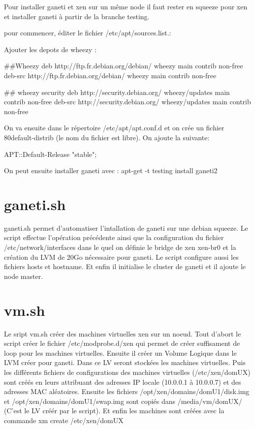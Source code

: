 
Pour installer ganeti et xen sur un même node il faut rester en squeeze pour xen et installer ganeti à partir  de la branche testing.

pour commencer, éditer le fichier /etc/apt/sources.list.:

Ajouter les depots de wheezy :

##Wheezy
deb http://ftp.fr.debian.org/debian/ wheezy main contrib non-free
deb-src http://ftp.fr.debian.org/debian/ wheezy main contrib non-free

## wheezy security
deb http://security.debian.org/ wheezy/updates main contrib non-free
deb-src http://security.debian.org/ wheezy/updates main contrib non-free


On va ensuite dans le répertoire /etc/apt/apt.conf.d et on crée un fichier 80default-distrib (le nom du fichier est libre). On ajoute la  suivante:

APT::Default-Release "stable";

On peut ensuite installer ganeti avec :
apt-get -t testing install ganeti2

\section {ganeti.sh}

ganeti.sh permet d'automatiser l'intallation de ganeti sur une debian squeeze.
Le script effectue l'opération précédente ainsi que la configuration du fichier /etc/network/interfaces dans le quel on définie le bridge de xen xen-br0 et la création du LVM de 20Go nécessaire pour ganeti.
Le script configure aussi les fichiers hosts et hostname.
Et enfin il initialise le cluster de ganeti et il ajoute le node master.

\section {vm.sh}

Le sript vm.sh créer des machines virtuelles xen sur un noeud.
Tout d'abort le script créer le fichier /etc/modprobe.d/xen qui permet de créer suffisament de loop pour les machines virtuelles.
Ensuite il créer un Volume Logique dans le LVM créer pour ganeti. Dans ce LV seront stockées les machines virtuelles.
Puis les différents fichiers de configurations des machines virtuelles (/etc/xen/domUX) sont créés en leurs attribuant des adresses IP locale (10.0.0.1 à 10.0.0.7) et des adresses MAC aléatoires.
Ensuite les fichiers  /opt/xen/domains/domU1/disk.img et /opt/xen/domains/domU1/swap.img sont copiés dans /media/vm/domUX/ (C'est le LV créér par le script).
Et enfin les machines sont créées avec la commande xm create /etc/xen/domUX


